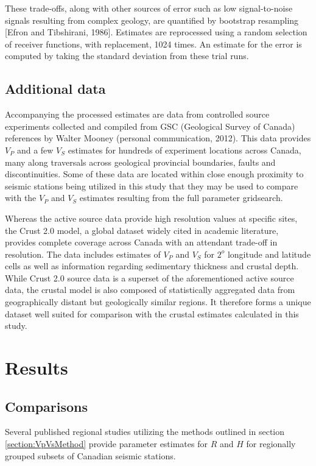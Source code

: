 \documentclass[draft, 12pt]{article}
\begin{document}
  These trade-offs, along with other sources of error such as low signal-to-noise signals resulting from complex geology, are quantified by bootstrap resampling [Efron and Tibshirani, 1986]. Estimates are reprocessed using a random selection of receiver functions, with replacement, 1024 times. An estimate for the error is computed by taking the standard deviation from these trial runs.

\subsection{Additional data}
   Accompanying the processed estimates are data from controlled source experiments collected and compiled from GSC (Geological Survey of Canada) references by Walter Mooney (personal communication, 2012). This data provides $V_P$ and a few $V_S$ estimates for hundreds of experiment locations across Canada, many along traversals across geological provincial boundaries, faults and discontinuities. Some of these data are located within close enough proximity to seismic stations being utilized in this study that they may be used to compare with the $V_P$ and $V_S$ estimates resulting from the full parameter gridsearch.

  Whereas the active source data provide high resolution values at specific sites, the Crust 2.0 model, a global dataset widely cited in academic literature, provides complete coverage across Canada with an attendant trade-off in resolution. The data includes estimates of $V_P$ and $V_S$ for $2^o$ longitude and latitude cells as well as information regarding sedimentary thickness and crustal depth. While Crust 2.0 source data is a superset of the aforementioned active source data, the crustal model is also composed of statistically aggregated data from geographically distant but geologically similar regions. It therefore forms a unique dataset well suited for comparison with the crustal estimates calculated in this study.

\section{Results}

\subsection{Comparisons}

  Several published regional studies utilizing the methods outlined in section \ref{section:VpVsMethod} provide parameter estimates for $R$ and $H$ for regionally grouped subsets of Canadian seismic stations.
\end{document}
